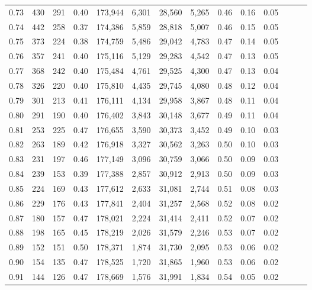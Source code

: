 \begin{tabular}{rrrrrrrrrrrrrr}
0.73 &    430 &  291 &  0.40 &  173,944 &    6,301 &  28,560 &   5,265 &  0.46 &  0.16 &      0.05 \\
0.74 &    442 &  258 &  0.37 &  174,386 &    5,859 &  28,818 &   5,007 &  0.46 &  0.15 &      0.05 \\
0.75 &    373 &  224 &  0.38 &  174,759 &    5,486 &  29,042 &   4,783 &  0.47 &  0.14 &      0.05 \\
0.76 &    357 &  241 &  0.40 &  175,116 &    5,129 &  29,283 &   4,542 &  0.47 &  0.13 &      0.05 \\
0.77 &    368 &  242 &  0.40 &  175,484 &    4,761 &  29,525 &   4,300 &  0.47 &  0.13 &      0.04 \\
0.78 &    326 &  220 &  0.40 &  175,810 &    4,435 &  29,745 &   4,080 &  0.48 &  0.12 &      0.04 \\
0.79 &    301 &  213 &  0.41 &  176,111 &    4,134 &  29,958 &   3,867 &  0.48 &  0.11 &      0.04 \\
0.80 &    291 &  190 &  0.40 &  176,402 &    3,843 &  30,148 &   3,677 &  0.49 &  0.11 &      0.04 \\
0.81 &    253 &  225 &  0.47 &  176,655 &    3,590 &  30,373 &   3,452 &  0.49 &  0.10 &      0.03 \\
0.82 &    263 &  189 &  0.42 &  176,918 &    3,327 &  30,562 &   3,263 &  0.50 &  0.10 &      0.03 \\
0.83 &    231 &  197 &  0.46 &  177,149 &    3,096 &  30,759 &   3,066 &  0.50 &  0.09 &      0.03 \\
0.84 &    239 &  153 &  0.39 &  177,388 &    2,857 &  30,912 &   2,913 &  0.50 &  0.09 &      0.03 \\
0.85 &    224 &  169 &  0.43 &  177,612 &    2,633 &  31,081 &   2,744 &  0.51 &  0.08 &      0.03 \\
0.86 &    229 &  176 &  0.43 &  177,841 &    2,404 &  31,257 &   2,568 &  0.52 &  0.08 &      0.02 \\
0.87 &    180 &  157 &  0.47 &  178,021 &    2,224 &  31,414 &   2,411 &  0.52 &  0.07 &      0.02 \\
0.88 &    198 &  165 &  0.45 &  178,219 &    2,026 &  31,579 &   2,246 &  0.53 &  0.07 &      0.02 \\
0.89 &    152 &  151 &  0.50 &  178,371 &    1,874 &  31,730 &   2,095 &  0.53 &  0.06 &      0.02 \\
0.90 &    154 &  135 &  0.47 &  178,525 &    1,720 &  31,865 &   1,960 &  0.53 &  0.06 &      0.02 \\
0.91 &    144 &  126 &  0.47 &  178,669 &    1,576 &  31,991 &   1,834 &  0.54 &  0.05 &      0.02 \\

\end{tabular}
